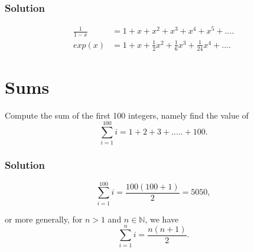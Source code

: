 \documentclass[12pt,a4paper,titlepage]{article}\usepackage[]{graphicx}\usepackage[]{color}
\begin{document}
\subsubsection*{Solution}
\begin{align*}
\frac{1}{1-x}&=1+x+x^{2}+x^{3}+x^{4}+x^{5}+....\\
exp(x)&=1+x+\frac{1}{2}x^{2}+\frac{1}{6}x^{3}+\frac{1}{24}x^{4}+....
\end{align*}




\section{Sums}

Compute the sum of the first 100 integers, namely find the value of
$$
\sum_{i=1}^{100} i =1 +2 + 3+ .....+100.
$$

\subsubsection*{Solution}

$$
\sum_{i=1}^{100} i = \frac{100(100+1)}{2} =5050,
$$

or more generally, for $n >1$ and $n \in \mathbb{N}$, we have
$$
\sum_{i=1}^{n} i = \frac{n(n+1)}{2}.
$$
\end{document}

